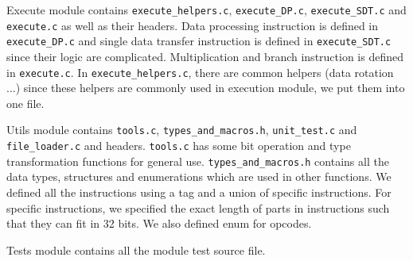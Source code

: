 \documentclass[10pt]{article}
\begin{document}
Execute module contains \texttt{execute\_helpers.c}, \texttt{execute\_DP.c}, \texttt{execute\_SDT.c} and \texttt{execute.c} as well as their headers. Data processing instruction is defined in \texttt{execute\_DP.c} and single data transfer instruction is defined in \texttt{execute\_SDT.c} since their logic are complicated. Multiplication and branch instruction is defined in \texttt{execute.c}. In \texttt{execute\_helpers.c}, there are common helpers (data rotation ...) since these helpers are commonly used in execution module, we put them into one file.

Utils module contains \texttt{tools.c}, \texttt{types\_and\_macros.h}, \texttt{unit\_test.c} and \texttt{file\_loader.c} and headers. \texttt{tools.c} has some bit operation and type transformation functions for general use. \texttt{types\_and\_macros.h} contains all the data types, structures and enumerations which are used in other functions. We defined all the instructions using a tag and a union of specific instructions. For specific instructions, we specified the exact length of parts in instructions such that they can fit in 32 bits. We also defined enum for opcodes.

Tests module contains all the module test source file.
\end{document}
